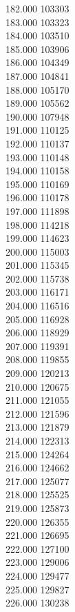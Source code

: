 { 182.000	103303 \\
 183.000	103323 \\
 184.000	103510 \\
 185.000	103906 \\
 186.000	104349 \\
 187.000	104841 \\
 188.000	105170 \\
 189.000	105562 \\
 190.000	107948 \\
 191.000	110125 \\
 192.000	110137 \\
 193.000	110148 \\
 194.000	110158 \\
 195.000	110169 \\
 196.000	110178 \\
 197.000	111898 \\
 198.000	114218 \\
 199.000	114623 \\
 200.000	115003 \\
 201.000	115345 \\
 202.000	115738 \\
 203.000	116171 \\
 204.000	116516 \\
 205.000	116928 \\
 206.000	118929 \\
 207.000	119391 \\
 208.000	119855 \\
 209.000	120213 \\
 210.000	120675 \\
 211.000	121055 \\
 212.000	121596 \\
 213.000	121879 \\
 214.000	122313 \\
 215.000	124264 \\
 216.000	124662 \\
 217.000	125077 \\
 218.000	125525 \\
 219.000	125873 \\
 220.000	126355 \\
 221.000	126695 \\
 222.000	127100 \\
 223.000	129006 \\
 224.000	129477 \\
 225.000	129827 \\
 226.000	130238 \\
}

